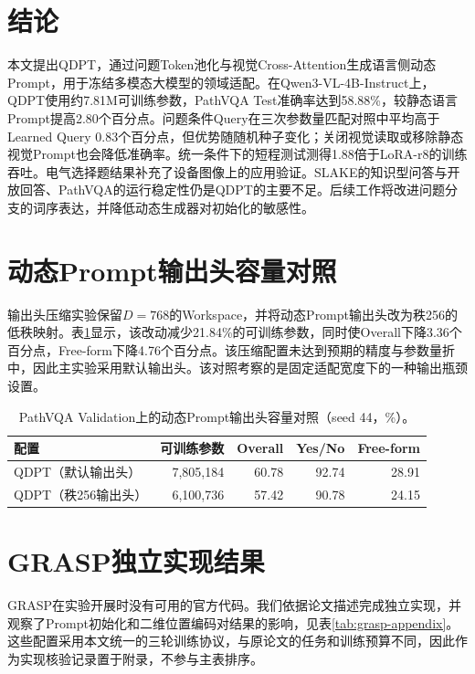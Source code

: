 \documentclass[pdflatex,sn-mathphys-num]{sn-jnl}
\begin{document}
\section{结论}

本文提出QDPT，通过问题Token池化与视觉Cross-Attention生成语言侧动态Prompt，用于冻结多模态大模型的领域适配。在Qwen3-VL-4B-Instruct上，QDPT使用约7.81M可训练参数，PathVQA Test准确率达到58.88\%，较静态语言Prompt提高2.80个百分点。问题条件Query在三次参数量匹配对照中平均高于Learned Query 0.83个百分点，但优势随随机种子变化；关闭视觉读取或移除静态视觉Prompt也会降低准确率。统一条件下的短程测试测得1.88倍于LoRA-r8的训练吞吐。电气选择题结果补充了设备图像上的应用验证。SLAKE的知识型问答与开放回答、PathVQA的运行稳定性仍是QDPT的主要不足。后续工作将改进问题分支的词序表达，并降低动态生成器对初始化的敏感性。

\appendix
\section{动态Prompt输出头容量对照}
\label{sec:output-head-appendix}

输出头压缩实验保留$D=768$的Workspace，并将动态Prompt输出头改为秩256的低秩映射。表\ref{tab:output-head}显示，该改动减少21.84\%的可训练参数，同时使Overall下降3.36个百分点，Free-form下降4.76个百分点。该压缩配置未达到预期的精度与参数量折中，因此主实验采用默认输出头。该对照考察的是固定适配宽度下的一种输出瓶颈设置。

\begin{table}[t]
    \centering
    \caption{PathVQA Validation上的动态Prompt输出头容量对照（seed 44，\%）。}
    \label{tab:output-head}
    \small
    \begin{tabular}{@{}lrrrr@{}}
        \toprule
        配置 & 可训练参数 & Overall & Yes/No & Free-form \\
        \midrule
        QDPT（默认输出头） & 7,805,184 & 60.78 & 92.74 & 28.91 \\
        QDPT（秩256输出头） & 6,100,736 & 57.42 & 90.78 & 24.15 \\
        \bottomrule
    \end{tabular}
\end{table}
\section{GRASP独立实现结果}
\label{sec:grasp-appendix}

GRASP在实验开展时没有可用的官方代码。我们依据论文描述完成独立实现，并观察了Prompt初始化和二维位置编码对结果的影响，见表\ref{tab:grasp-appendix}。这些配置采用本文统一的三轮训练协议，与原论文的任务和训练预算不同，因此作为实现核验记录置于附录，不参与主表排序。
\end{document}
